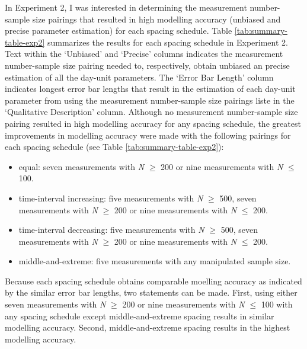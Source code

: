 \documentclass[
12pt, %
twoside,
english]{guelphthesis}
\theoremstyle{definition}
\theoremstyle{definition}
\theoremstyle{definition}
\theoremstyle{definition}
\theoremstyle{remark}
\begin{document}
In Experiment 2, I was interested in determining the measurement number-sample size pairings that resulted in high modelling accuracy (unbiased and precise parameter estimation) for each spacing schedule. Table \ref{tab:summary-table-exp2} summarizes the results for each spacing schedule in Experiment 2. Text within the `Unbiased' and `Precise' columns indicates the measurement number-sample size pairing needed to, respectively, obtain unbiased an precise estimation of all the day-unit parameters. The `Error Bar Length' column indicates longest error bar lengths that result in the estimation of each day-unit parameter from using the measurement number-sample size pairings liste in the `Qualitative Description' column. Although no measurement number-sample size pairing resulted in high modelling accuracy for any spacing schedule, the greatest improvements in modelling accuracy were made with the following pairings for each spacing schedule (see Table \ref{tab:summary-table-exp2}):
\begin{itemize}
\tightlist
\item
  equal: seven measurements with \emph{N} \(\ge\) 200 or nine measurements with \emph{N} \(\le\) 100.
\item
  time-interval increasing: five measurements with \emph{N} \(\ge\) 500, seven measurements with \emph{N} \(\ge\) 200 or nine measurements with \emph{N} \(\le\) 200.
\item
  time-interval decreasing: five measurements with \emph{N} \(\ge\) 500, seven measurements with \emph{N} \(\ge\) 200 or nine measurements with \emph{N} \(\le\) 200.
\item
  middle-and-extreme: five measurements with any manipulated sample size.
\end{itemize}
\noindent Because each spacing schedule obtains comparable moelling accuracy as indicated by the similar error bar lengths, two statements can be made. First, using either seven measurements with \emph{N} \(\ge\) 200 or nine measurements with \emph{N} \(\le\) 100 with any spacing schedule except middle-and-extreme spacing results in similar modelling accuracy. Second, middle-and-extreme spacing results in the highest modelling accuracy.
\end{document}
